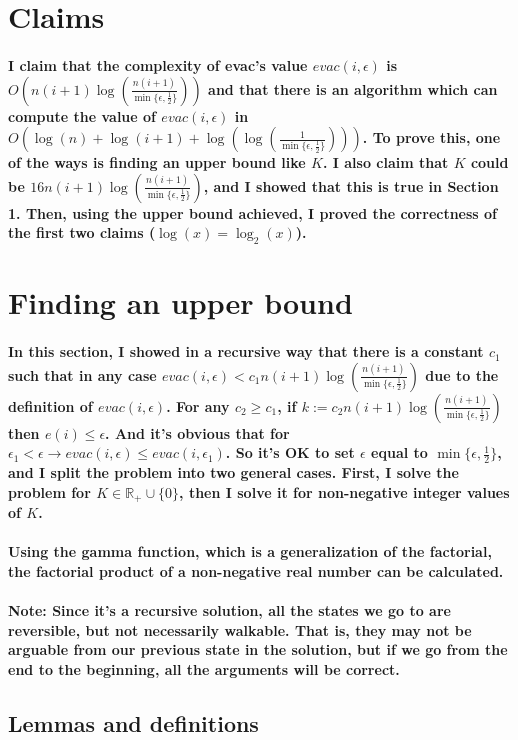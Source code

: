 \documentclass[oneside]{book}
\newcommand{\myparagraph}[1]{\paragraph{\textnormal{#1}}}
\begin{document}
\small

\section*{Claims}

\myparagraph{
I claim that the complexity of evac's value $evac(i, \epsilon)$ is $O(n(i+1)\log(\frac{n(i+1)}{\min\{\epsilon, \frac{1}{2}\}}))$ and that there is an algorithm which can compute the value of $evac(i, \epsilon)$ in $O(\log(n)+\log(i+1)+\log(\log(\frac{1}{\min\{\epsilon, \frac{1}{2}\}})))$. To prove this, one of the ways is finding an upper bound like $K$. I also claim that $K$ could be $16n(i+1)\log(\frac{n(i+1)}{\min\{\epsilon, \frac{1}{2}\}})$, and I showed that this is true in Section 1. Then, using the upper bound achieved, I proved the correctness of the first two claims ($\log(x) = \log_2(x)$).
}

\section{Finding an upper bound}

\myparagraph{
In this section, I showed in a recursive way that there is a constant $c_1$ such that in any case $evac(i, \epsilon) < c_1 n(i+1)\log(\frac{n(i+1)}{\min\{\epsilon, \frac{1}{2}\}})$ due to the definition of $evac(i, \epsilon)$. For any $c_2 \ge c_1$, if $k := c_2 n(i+1)\log(\frac{n(i+1)}{\min\{\epsilon, \frac{1}{2}\}})$ then $e(i) \le \epsilon$. And it's obvious that for $\epsilon_1 < \epsilon \rightarrow evac(i, \epsilon) \le evac(i, \epsilon_1)$. So it's OK to set $\epsilon$ equal to $\min\{\epsilon, \frac{1}{2}\}$, and I split the problem into two general cases. First, I solve the problem for $K \in \mathbb{R}_+ \cup \{0\}$, then I solve it for non-negative integer values of $K$.
}

\myparagraph{
Using the gamma function, which is a generalization of the factorial, the factorial product of a non-negative real number can be calculated.
}

\myparagraph{
\textbf{Note:} Since it's a recursive solution, all the states we go to are reversible, but not necessarily walkable. That is, they may not be arguable from our previous state in the solution, but if we go from the end to the beginning, all the arguments will be correct.
}

\subsection{Lemmas and definitions}
\end{document}

